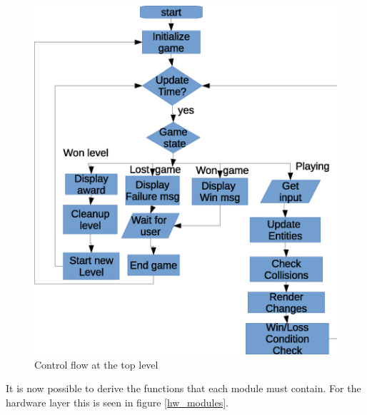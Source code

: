 \begin{figure}
	\center
	\includegraphics[scale=0.7]{pictures/top_flow.eps}
	\caption{Control flow at the top level}
	\label{top_flow}
\end{figure}

\clearpage

It is now possible to derive the functions that each module must contain. For the hardware layer this is seen
in figure \ref{hw_modules}. \\

